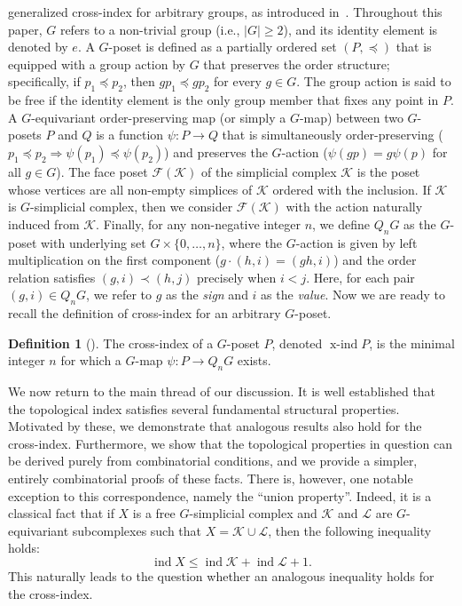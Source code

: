 \documentclass[preprint,12pt]{article}
\renewcommand{\le}{\leqslant}
\renewcommand{\ge}{\geqslant}
\theoremstyle{definition}
\newtheorem{definition}[theorem]{Definition}
\theoremstyle{remark}
\numberwithin{equation}{section}
\DeclareMathOperator{\ind}{ind}
\DeclareMathOperator{\xind}{x-ind}
\begin{document}
generalized cross-index for arbitrary groups, as introduced in~\cite{bui2023topological}. Throughout this paper, $G$ refers to a non-trivial group (i.e., $|G| \ge 2$), and its identity element is denoted by $e$. A $G$-poset is defined as a partially ordered set $(P, \preceq)$ that is equipped with a group action by $G$ that preserves the order structure; specifically, if $p_1 \preceq p_2$, then $g p_1 \preceq g p_2$ for every $g \in G$. The group action is said to be free if the identity element is the only group member that fixes any point in $P$. A $G$-equivariant order-preserving map (or simply a $G$-map) between two $G$-posets $P$ and $Q$ is a function $\psi : P \to Q$ that is simultaneously order-preserving ($p_1 \preceq p_2 \Rightarrow \psi(p_1) \preceq \psi(p_2)$) and preserves the $G$-action ($\psi(g p) = g \psi(p)$ for all $g \in G$). The face poset $\mathcal{F}(\mathcal{K})$ of the simplicial complex $\mathcal{K}$ is the poset whose vertices are all non-empty simplices of $\mathcal{K}$ ordered with the inclusion. If $\mathcal{K}$ is $G$-simplicial complex, then we consider $\mathcal{F}(\mathcal{K})$  with the action naturally induced from $\mathcal{K}$. Finally, for any non-negative integer $n$, we define $Q_n G$ as the $G$-poset with underlying set $G \times\{0, \dots, n\}$, where the $G$-action is given by left multiplication on the first component ($g \cdot (h, i) = (g h, i)$) and the order relation satisfies $(g, i) \prec (h, j)$ precisely when $i < j$. Here, for each pair $(g,i) \in Q_n G$, we refer to $g$ as the \emph{sign} and $i$ as the \emph{value}. Now we are ready to recall the definition of cross-index for an arbitrary $G$-poset.

\begin{definition}[\cite{bui2023topological}]
The cross-index of a $G$-poset $P$, denoted $\xind P$, is the minimal integer $n$ for which a $G$-map $\psi : P \to Q_n G$ exists.
\end{definition}


We now return to the main thread of our discussion. It is well established that the topological index satisfies several fundamental structural properties. Motivated by these, we demonstrate that analogous results also hold for the cross-index. Furthermore, we show that the topological properties in question can be derived purely from combinatorial conditions, and we provide a simpler, entirely combinatorial proofs of these facts. There is, however, one notable exception to this correspondence, namely the ``union property''. Indeed, it is a classical fact that if \(X\) is a free \(G\)-simplicial complex and \(\mathcal{K}\) and \(\mathcal{L}\) are \(G\)-equivariant subcomplexes such that \(X = \mathcal{K} \cup \mathcal{L}\), then the following inequality holds:
\[
\ind X \le \ind \mathcal{K} + \ind \mathcal{L} + 1.
\]
This naturally leads to the question whether an analogous inequality holds for the cross-index.
\end{document}
